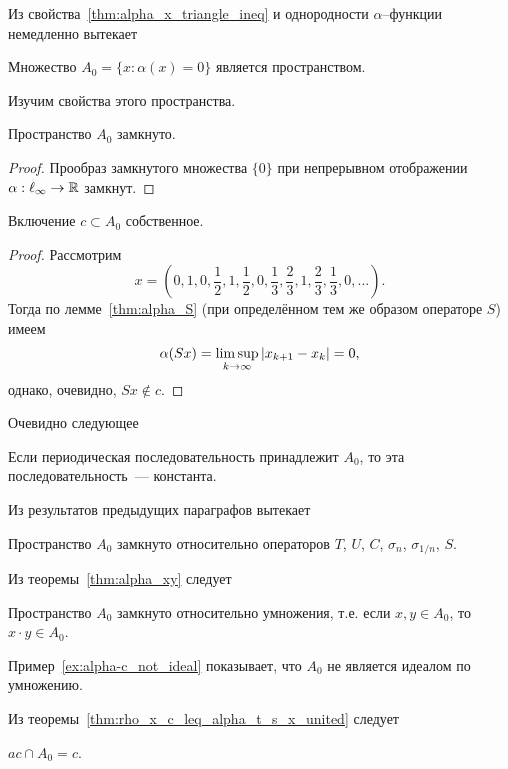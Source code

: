 \label{sec:space_A0}

Из свойства~\ref{thm:alpha_x_triangle_ineq} и однородности $\alpha$--функции немедленно вытекает
\begin{theorem}
	\label{thm:A0_is_space}
	Множество $A_0 = \{x: \alpha(x) = 0\}$
	является пространством.
\end{theorem}
Изучим свойства этого пространства.
\begin{property}
	Пространство $A_0$ замкнуто.
\end{property}
\begin{proof}
	Прообраз замкнутого множества $\{0\}$
	при непрерывном отображении $\alpha : \ell_\infty \to \R$
	замкнут.
\end{proof}
\begin{theorem}
	Включение $c \subset A_0$ собственное.
\end{theorem}
\begin{proof}
	Рассмотрим
	\begin{equation}
		x=\left(
			0,1,
			0,\frac{1}{2},1,\frac{1}{2},
			0,\frac{1}{3},\frac{2}{3},1,\frac{2}{3},\frac{1}{3},
			0,
			...
		\right)
		.
	\end{equation}
	Тогда по лемме~\ref{thm:alpha_S} (при определённом тем же образом операторе $S$) имеем
	\begin{equation}
		\alpha(Sx) = \varlimsup_{k\to\infty} |x_{k+1} - x_{k}| = 0
		,
	\end{equation}
	однако, очевидно, $Sx\notin c$.
\end{proof}
Очевидно следующее
\begin{property}
	Если периодическая последовательность принадлежит $A_0$,
	то эта последовательность~--- константа.
\end{property}

Из результатов предыдущих параграфов вытекает
\begin{theorem}
	Пространство $A_0$ замкнуто относительно операторов $T$, $U$, $C$, $\sigma_n$, $\sigma_{1/n}$, $S$.
\end{theorem}

Из теоремы~\ref{thm:alpha_xy} следует
\begin{theorem}
	Пространство $A_0$ замкнуто относительно умножения,
	т.е. если $x,y\in A_0$, то $x\cdot y \in A_0$.
\end{theorem}

Пример~\ref{ex:alpha-c_not_ideal} показывает, что $A_0$
не является идеалом по умножению.

Из теоремы~\ref{thm:rho_x_c_leq_alpha_t_s_x_united} следует
\begin{theorem}
	$ac \cap A_0 = c$.
\end{theorem}

